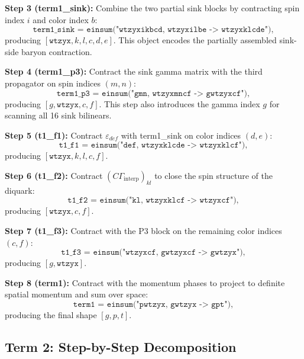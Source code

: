 \documentclass[11pt,a4paper]{article}
\newcommand{\eps}{\varepsilon}
\newcommand{\Gint}{\Gamma_{\text{interp}}}
\newcommand{\Cmat}{C}
\begin{document}
\medskip\noindent
\textbf{Step 3 (term1\_sink):} Combine the two partial sink blocks by contracting
spin index $i$ and color index $b$:
\begin{equation}
  \texttt{term1\_sink = einsum("wtzyxikbcd, wtzyxilbe -> wtzyxklcde")},
\end{equation}
producing $[\texttt{wtzyx},k,l,c,d,e]$.  This object encodes the partially
assembled sink-side baryon contraction.

\medskip\noindent
\textbf{Step 4 (term1\_p3):} Contract the sink gamma matrix with the third
propagator on spin indices $(m,n)$:
\begin{equation}
  \texttt{term1\_p3 = einsum("gmn, wtzyxmncf -> gwtzyxcf")},
\end{equation}
producing $[g,\texttt{wtzyx},c,f]$.  This step also introduces the gamma index
$g$ for scanning all 16 sink bilinears.

\medskip\noindent
\textbf{Step 5 (t1\_f1):} Contract $\eps_{def}$ with term1\_sink on color indices
$(d,e)$:
\begin{equation}
  \texttt{t1\_f1 = einsum("def, wtzyxklcde -> wtzyxklcf")},
\end{equation}
producing $[\texttt{wtzyx},k,l,c,f]$.

\medskip\noindent
\textbf{Step 6 (t1\_f2):} Contract $(\Cmat\Gint)_{kl}$ to close the spin structure
of the diquark:
\begin{equation}
  \texttt{t1\_f2 = einsum("kl, wtzyxklcf -> wtzyxcf")},
\end{equation}
producing $[\texttt{wtzyx},c,f]$.

\medskip\noindent
\textbf{Step 7 (t1\_f3):} Contract with the P3 block on the remaining color
indices $(c,f)$:
\begin{equation}
  \texttt{t1\_f3 = einsum("wtzyxcf, gwtzyxcf -> gwtzyx")},
\end{equation}
producing $[g,\texttt{wtzyx}]$.

\medskip\noindent
\textbf{Step 8 (term1):} Contract with the momentum phases to project to definite
spatial momentum and sum over space:
\begin{equation}
  \texttt{term1 = einsum("pwtzyx, gwtzyx -> gpt")},
\end{equation}
producing the final shape $[g,p,t]$.

\subsection{Term 2: Step-by-Step Decomposition}
\end{document}
